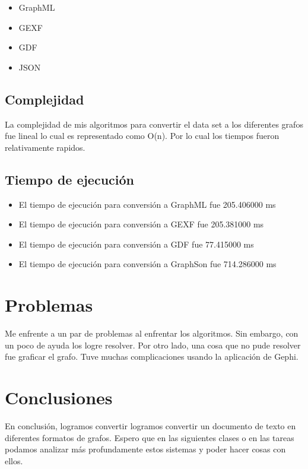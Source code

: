 \documentclass[acmsmall]{acmart}
\begin{document}
\begin{itemize}
\item GraphML
\item GEXF
\item GDF
\item JSON
\end{itemize}


\subsection{Complejidad}
La complejidad de mis algoritmos para convertir el data set a los diferentes grafos fue lineal lo cual es representado como O(n). Por lo cual los tiempos fueron relativamente rapidos.

\subsection{Tiempo de ejecución}
\begin{itemize}
\item El tiempo de ejecución para conversión a GraphML fue 205.406000 ms 
\item El tiempo de ejecución para conversión a GEXF fue 205.381000 ms 
\item El tiempo de ejecución para conversión a GDF fue 77.415000 ms 
\item El tiempo de ejecución para conversión a GraphSon fue 714.286000 ms 
\end{itemize}
\section{Problemas}
Me enfrente a un par de problemas al enfrentar los algoritmos. Sin embargo, con un poco de ayuda los logre resolver. Por otro lado, una cosa que no pude resolver fue graficar el grafo. Tuve muchas complicaciones usando la aplicación de Gephi.
\section{Conclusiones}
En conclusión, logramos convertir logramos convertir un documento de texto en diferentes formatos de grafos. Espero que en las siguientes clases o en las tareas podamos analizar más profundamente estos sistemas y poder hacer cosas con ellos.
\end{document}
